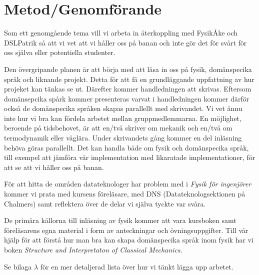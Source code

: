 \documentclass[12pt,a4paper]{article}
\begin{document}




\section{Metod/Genomförande}

Som ett genomgående tema vill vi arbeta in återkoppling med FysikÅke och DSLPatrik så att vi vet att vi håller oss på banan och inte gör det för svårt för oss själva eller potentiella studenter.

Den övergripande planen är att börja med att läsa in oss på fysik, domänspecika språk och liknande projekt. Detta för att få en grundläggande uppfattning av hur projeket kan tänkas se ut. Därefter kommer handledningen att skrivas. Eftersom domänsepcika spårk kommer presenteras varvat i handledningen kommer därför också de domänspecika språken skapas parallellt med skrivandet. Vi vet ännu inte hur vi bra kan fördela arbetet mellan gruppmedlemmarna. En möjlighet, beroende på tidsbehovet, är att en/två skriver om mekanik och en/två om termodynamik eller våglära. Under skrivandets gång kommer en del inläsning behöva göras parallellt. Det kan handla både om fysik och domänspecika språk, till exempel att jämföra vår implementation med likaratade implementationer, för att se att vi håller oss på banan.

För att hitta de områden datateknologer har problem med i \textit{Fysik för ingenjörer} kommer vi prata med kursens föreläsare, med DNS (Datateknologsektionen på Chalmers) samt reflektera över de delar vi själva tyckte var svåra.

De primära källorna till inläsning av fysik kommer att vara kursboken samt föreläsarens egna material i form av anteckningar och övningsuppgifter. Till vår hjälp för att förstå hur man bra kan skapa domänspecika språk inom fysik har vi boken \textit{Structure and Interpretaton of Classical Mechanics}\cite{SICM}.

Se bilaga $\lambda$ för en mer detaljerad lista över hur vi tänkt lägga upp arbetet.
\end{document}
